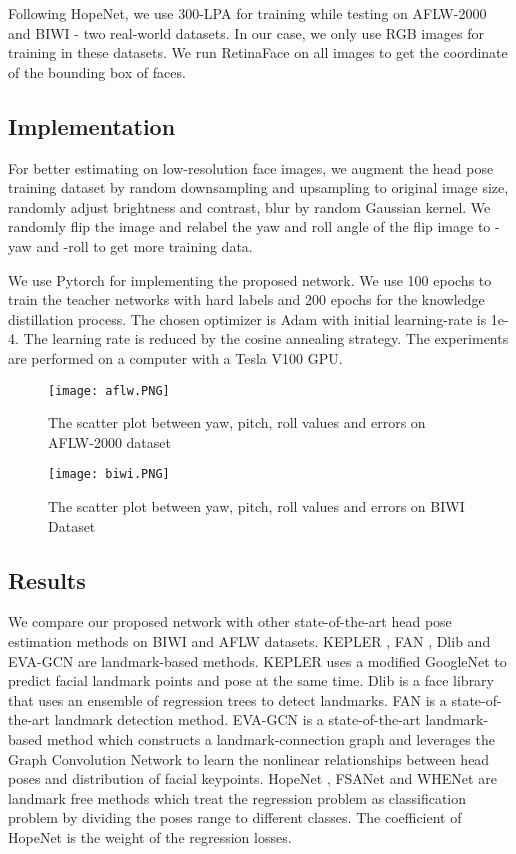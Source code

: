 \documentclass[a4paper,twoside]{article}
\begin{document}
Following HopeNet, we use 300-LPA for training while testing on AFLW-2000 and BIWI - two real-world datasets. In our case, we only use RGB images for training in these datasets. We run RetinaFace \cite{deng2019retinaface} on all images to get the coordinate of the bounding box of faces.

\subsection{Implementation}
For better estimating on low-resolution face images, we augment the head pose training dataset by random downsampling and upsampling to original image size, randomly adjust brightness and contrast, blur by random Gaussian kernel.
We randomly flip the image and relabel the yaw and roll angle of the flip image to -yaw and -roll to get more training data. 

We use Pytorch for implementing the proposed network. We use 100 epochs to train the teacher networks with hard labels and 200 epochs for the knowledge distillation process. The chosen optimizer is Adam with initial learning-rate is 1e-4. The learning rate is reduced by the cosine annealing strategy. The experiments are performed on a computer with a Tesla V100 GPU.
\begin{figure*}[htbp]
    \centering
    \texttt{[image: aflw.PNG]}
    \caption{The scatter plot between yaw, pitch, roll values and errors on AFLW-2000 dataset}
    \label{fig:galaxy}
\end{figure*}
\begin{figure*}[htbp]
    \centering
    \texttt{[image: biwi.PNG]}
    \caption{The scatter plot between yaw, pitch, roll values and errors on BIWI Dataset}
    \label{fig:galaxy}
\end{figure*}
\subsection{Results}

We compare our proposed network with other state-of-the-art head pose estimation methods on BIWI and AFLW datasets. KEPLER \cite{kumar2017kepler}, FAN \cite{bulat2017far}, Dlib \cite{kazemi2014one} and EVA-GCN \cite{xin2021eva} are landmark-based methods. KEPLER \cite{kumar2017kepler} uses a modified GoogleNet to predict facial landmark points and pose at the same time. Dlib \cite{kazemi2014one} is a face library that uses an ensemble of regression trees to detect landmarks. FAN \cite{bulat2017far} is a state-of-the-art landmark detection method. EVA-GCN \cite{xin2021eva} is a state-of-the-art landmark-based method which constructs a landmark-connection graph and leverages the Graph Convolution Network \cite{yan2018spatial} to learn the nonlinear relationships between head poses and distribution of facial keypoints. HopeNet \cite{ruiz2018fine}, FSANet \cite{yang2019fsa} and WHENet \cite{zhou2020whenet} are landmark free methods which treat the regression problem as classification problem by dividing the poses range to different classes. The  coefficient of HopeNet is the weight of the regression losses. 
\end{document}
